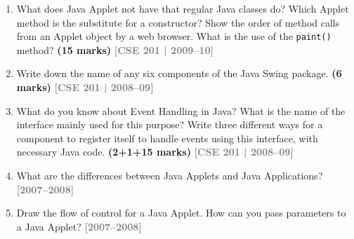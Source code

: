 \documentclass[12pt,a3paper]{article}
\newcommand{\yr}[1]{\hfill\textcolor{gray}{\small\textbf{[#1]}}}
\newcommand{\mk}[1]{\textcolor{orange!70!black}{\small\textbf{(#1 marks)}}}
\begin{document}
\begin{enumerate}
\item What does Java Applet not have that regular Java classes do? Which Applet method is the substitute for a constructor? Show the order of method calls from an Applet object by a web browser. What is the use of the \texttt{paint()} method? \mk{15}
\yr{CSE 201 | 2009--10}






\item Write down the name of any six components of the Java Swing package. \mk{6}
\yr{CSE 201 | 2008--09}







\item What do you know about Event Handling in Java? What is the name of the interface mainly used for this purpose? Write three different ways for a component to register itself to handle events using this interface, with necessary Java code. \mk{2+1+15}
\yr{CSE 201 | 2008--09}








\item What are the differences between Java Applets and Java Applications?
\yr{2007--2008}

\item Draw the flow of control for a Java Applet. How can you pass parameters to a Java Applet?
\yr{2007--2008}









\end{enumerate}
\end{document}
